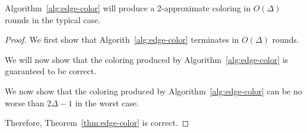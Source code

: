\begin{thm}
Algorithm~\ref{alg:edge-color} will produce a 2-approximate coloring in $O(\Delta)$ rounds in the typical case.
\label{thm:edge-color}
\end{thm}
\begin{proof}
We first show that Algorith~\ref{alg:edge-color} terminates in $O(\Delta)$ rounds.


We will now show that the coloring produced by Algorithm~\ref{alg:edge-color} is guaranteed to be correct.

We now show that the coloring produced by Algorithm~\ref{alg:edge-color} can be no worse than $2\Delta - 1$ in the worst case.

Therefore, Theorem~\ref{thm:edge-color} is correct.
\end{proof}
